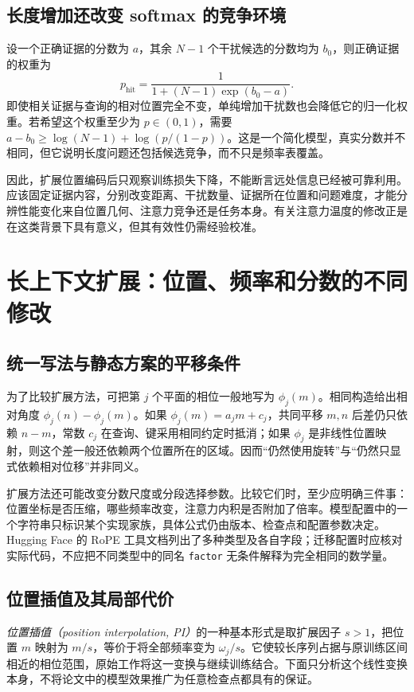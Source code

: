 \documentclass[UTF8,12pt,a4paper,fontset=fandol]{ctexart}
\begin{document}
\subsection{长度增加还改变 softmax 的竞争环境}
设一个正确证据的分数为 $a$，其余 $N-1$ 个干扰候选的分数均为 $b_0$，则正确证据的权重为
\begin{equation}
p_{\mathrm{hit}}=\frac{1}{1+(N-1)\exp(b_0-a)}.
\label{eq:rope-distractor}
\end{equation}
即使相关证据与查询的相对位置完全不变，单纯增加干扰数也会降低它的归一化权重。若希望这个权重至少为 $p\in(0,1)$，需要 $a-b_0\geq\log(N-1)+\log(p/(1-p))$。这是一个简化模型，真实分数并不相同，但它说明长度问题还包括候选竞争，而不只是频率表覆盖。

因此，扩展位置编码后只观察训练损失下降，不能断言远处信息已经被可靠利用。应该固定证据内容，分别改变距离、干扰数量、证据所在位置和问题难度，才能分辨性能变化来自位置几何、注意力竞争还是任务本身。有关注意力温度的修改正是在这类背景下具有意义，但其有效性仍需经验校准。

\section{长上下文扩展：位置、频率和分数的不同修改}
\label{sec:rope-scaling}

\subsection{统一写法与静态方案的平移条件}
为了比较扩展方法，可把第 $j$ 个平面的相位一般地写为 $\phi_j(m)$。相同构造给出相对角度 $\phi_j(n)-\phi_j(m)$。如果 $\phi_j(m)=a_jm+c_j$，共同平移 $m,n$ 后差仍只依赖 $n-m$，常数 $c_j$ 在查询、键采用相同约定时抵消；如果 $\phi_j$ 是非线性位置映射，则这个差一般还依赖两个位置所在的区域。因而“仍然使用旋转”与“仍然只显式依赖相对位移”并非同义。

扩展方法还可能改变分数尺度或分段选择参数。比较它们时，至少应明确三件事：位置坐标是否压缩，哪些频率改变，注意力内积是否附加了倍率。模型配置中的一个字符串只标识某个实现家族，具体公式仍由版本、检查点和配置参数决定。Hugging Face 的 RoPE 工具文档列出了多种类型及各自字段\cite{hf-rope}；迁移配置时应核对实际代码，不应把不同类型中的同名 \texttt{factor} 无条件解释为完全相同的数学量。

\subsection{位置插值及其局部代价}
\emph{位置插值（position interpolation, PI）}的一种基本形式是取扩展因子 $s>1$，把位置 $m$ 映射为 $m/s$，等价于将全部频率变为 $\omega_j/s$。它使较长序列占据与原训练区间相近的相位范围，原始工作将这一变换与继续训练结合\cite{chen2023}。下面只分析这个线性变换本身，不将论文中的模型效果推广为任意检查点都具有的保证。
\end{document}
